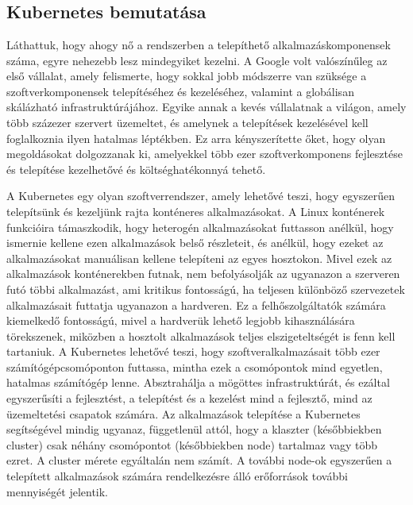 \chapter{\kubernetes}
\section{Kubernetes bemutatása}
Láthattuk, hogy ahogy nő a rendszerben a telepíthető alkalmazáskomponensek száma, egyre nehezebb lesz mindegyiket kezelni. A Google volt valószínűleg az első vállalat, amely felismerte, hogy sokkal jobb módszerre van szüksége a szoftverkomponensek telepítéséhez és kezeléséhez, valamint a globálisan skálázható infrastruktúrájához. Egyike annak a kevés vállalatnak a világon, amely több százezer szervert üzemeltet, és amelynek a telepítések kezelésével kell foglalkoznia ilyen hatalmas léptékben. Ez arra kényszerítette őket, hogy olyan megoldásokat dolgozzanak ki, amelyekkel több ezer szoftverkomponens fejlesztése és telepítése kezelhetővé és költséghatékonnyá tehető.

A Kubernetes egy olyan szoftverrendszer, amely lehetővé teszi, hogy egyszerűen telepítsünk és kezeljünk rajta konténeres alkalmazásokat. A Linux konténerek funkcióira támaszkodik, hogy heterogén alkalmazásokat futtasson anélkül, hogy ismernie kellene ezen alkalmazások belső részleteit, és anélkül, hogy ezeket az alkalmazásokat manuálisan kellene telepíteni az egyes hosztokon. Mivel ezek az alkalmazások konténerekben futnak, nem befolyásolják az ugyanazon a szerveren futó többi alkalmazást, ami kritikus fontosságú, ha teljesen különböző szervezetek alkalmazásait futtatja ugyanazon a hardveren. Ez a felhőszolgáltatók számára kiemelkedő fontosságú, mivel a hardverük lehető legjobb kihasználására törekszenek, miközben a hosztolt alkalmazások teljes elszigeteltségét is fenn kell tartaniuk. A Kubernetes lehetővé teszi, hogy szoftveralkalmazásait több ezer számítógépcsomóponton futtassa, mintha ezek a csomópontok mind egyetlen, hatalmas számítógép lenne. Absztrahálja a mögöttes infrastruktúrát, és ezáltal egyszerűsíti a fejlesztést, a telepítést és a kezelést mind a fejlesztő, mind az üzemeltetési csapatok számára. Az alkalmazások telepítése a Kubernetes segítségével mindig ugyanaz, függetlenül attól, hogy a klaszter (későbbiekben cluster) csak néhány csomópontot (későbbiekben node) tartalmaz vagy több ezret. A cluster mérete egyáltalán nem számít. A további node-ok egyszerűen a telepített alkalmazások számára rendelkezésre álló erőforrások további mennyiségét jelentik.
\cite{Marko17}

